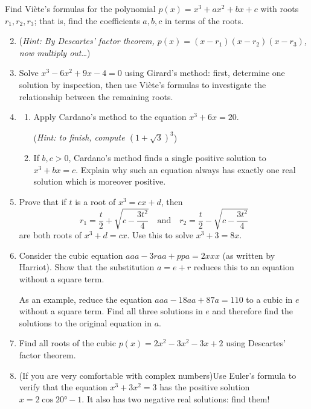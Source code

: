 \begin{exercises}{}{}
	\exstart Find Viète's formulas for the polynomial $p(x)=x^3+ax^2+bx+c$ with roots $r_1,r_2,r_3$; that is, find the coefficients $a,b,c$ in terms of the roots.\vspace{-10pt}
	
	\begin{enumerate}\setcounter{enumi}{1}
	  \item[](\emph{Hint: By Descartes' factor theorem, $p(x)=(x-r_1)(x-r_2)(x-r_3)$, now multiply out\ldots})
	  
		\item%
	  Solve $x^3-6x^2+9x-4=0$ using Girard's method: first, determine one solution by inspection, then use Viète's formulas to investigate the relationship between the remaining roots.
			
		\item\begin{enumerate}
		  \item Apply Cardano's method to the equation $x^3+6x=20$.\par
		  (\emph{Hint: to finish, compute $(1+\sqrt 3)^3$})
			\item If $b,c>0$, Cardano's method finds a single positive solution to $x^3+bx=c$. Explain why such an equation always has exactly one real solution which is moreover positive.
		\end{enumerate}
		
		\item%
		Prove that if $t$ is a root of $x^3=cx+d$, then
		\[
			r_1=\frac t2+\sqrt{c-\frac{3t^2}4}
			\quad\text{and}\quad 
			r_2=\frac t2-\sqrt{c-\frac{3t^2}4}
		\]
		are both roots of $x^3+d=cx$. Use this to solve $x^3+3=8x$.
		
	
		\item%
		Consider the cubic equation $aaa-3raa+ppa=2xxx$ (as written by Harriot). Show that the substitution $a=e+r$ reduces this to an equation without a square term.\par
		As an example, reduce the equation $aaa-18aa+87a=110$ to a cubic in $e$ without a square term. Find all three solutions in $e$ and therefore find the solutions to the original equation in $a$.
		
		
		\item Find all roots of the cubic $p(x)=2x^2-3x^2-3x+2$ using Descartes' factor theorem.
	  
		
		\item (If you are very comfortable with complex numbers)\lstsp Use Euler's formula to verify that the equation $x^3+3x^2=3$ has the positive solution $x=2\cos\ang{20}-1$. It also has two negative real solutions: find them! 
	\end{enumerate}
\end{exercises}

